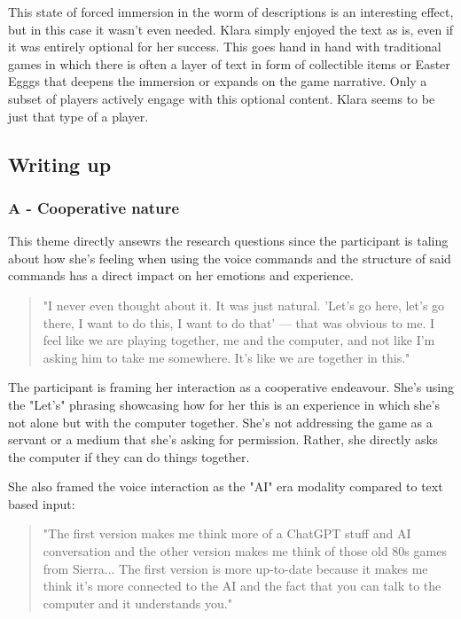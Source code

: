 This state of forced immersion in the worm of descriptions is an interesting effect, but in this case it wasn't even needed. Klara simply enjoyed the text as is, even if it was entirely optional for her success. This goes hand in hand with traditional games in which there is often a layer of text in form of collectible items or Easter Egggs that deepens the immersion or expands on the game narrative. Only a subset of players actively engage with this optional content. Klara seems to be just that type of a player.


\subsection{Writing up}


\subsubsection{A - Cooperative nature}
This theme directly ansewrs the research questions since the participant is taling about how she's feeling when using the voice commands and the structure of said commands has a direct impact on her emotions and experience.

\begin{quote}
    "I never even thought about it. It was just natural. 'Let's go here, let's go there, I want to do this, I want to do that' — that was obvious to me. I feel like we are playing together, me and the computer, and not like I'm asking him to take me somewhere. It's like we are together in this."
\end{quote}

The participant is framing her interaction as a cooperative endeavour. She's using the "Let's" phrasing showcasing how for her this is an experience in which she's not alone but with the computer together. She's not addressing the game as a servant or a medium that she's asking for permission. Rather, she directly asks the computer if they can do things together.

She also framed the voice interaction as the "AI" era modality compared to text based input:
\begin{quote}
    "The first version makes me think more of a ChatGPT stuff and AI conversation and the other version makes me think of those old 80s games from Sierra... The first version is more up-to-date because it makes me think it's more connected to the AI and the fact that you can talk to the computer and it understands you."
\end{quote}

